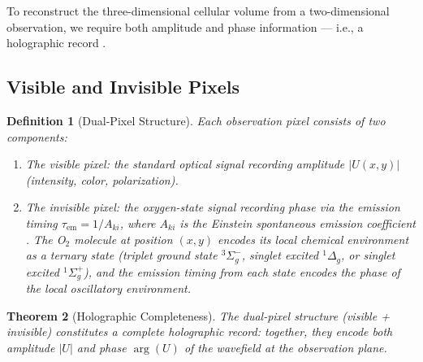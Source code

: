 \documentclass[11pt,twocolumn,a4paper]{article}
\newtheorem{theorem}{Theorem}[section]
\newtheorem{definition}[theorem]{Definition}
\newcommand{\tauem}{\tau_{\mathrm{em}}}
\begin{document}
To reconstruct the three-dimensional cellular volume from a
two-dimensional observation, we require both amplitude and phase
information --- i.e., a holographic record \citep{gabor1948}.

\subsection{Visible and Invisible Pixels}

\begin{definition}[Dual-Pixel Structure]
\label{def:dual-pixel}
Each observation pixel consists of two components:
\begin{enumerate}[label=(\roman*),leftmargin=*]
\item The \emph{visible pixel}: the standard optical signal recording
  amplitude $|U(x,y)|$ (intensity, color, polarization).
\item The \emph{invisible pixel}: the oxygen-state signal recording
  phase via the emission timing
  $\tauem = 1/A_{ki}$, where $A_{ki}$ is the Einstein spontaneous
  emission coefficient \citep{einstein1917}. The O$_2$ molecule at
  position $(x,y)$ encodes its local chemical environment as a ternary
  state (triplet ground state ${}^3\Sigma_g^-$, singlet excited
  ${}^1\Delta_g$, or singlet excited ${}^1\Sigma_g^+$), and the
  emission timing from each state encodes the phase of the local
  oscillatory environment.
\end{enumerate}
\end{definition}

\begin{theorem}[Holographic Completeness]
\label{thm:holographic}
The dual-pixel structure (visible + invisible) constitutes a complete
holographic record: together, they encode both amplitude $|U|$ and
phase $\arg(U)$ of the wavefield at the observation plane.
\end{theorem}
\end{document}
